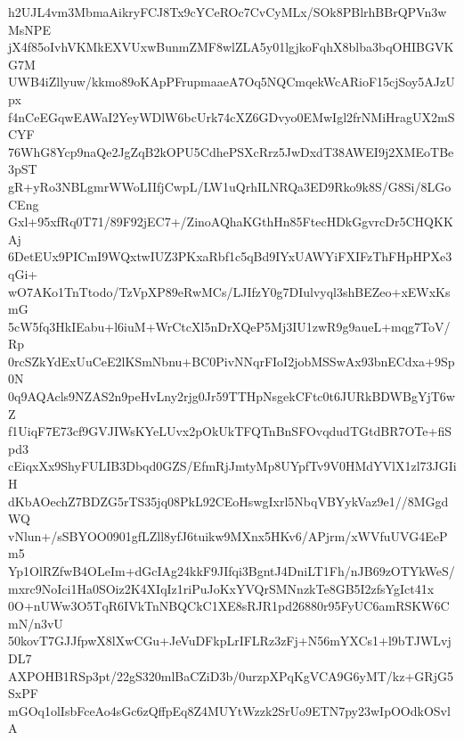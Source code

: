 h2UJL4vm3MbmaAikryFCJ8Tx9cYCeROc7CvCyMLx/SOk8PBlrhBBrQPVn3wMsNPE
jX4f85oIvhVKMkEXVUxwBunmZMF8wlZLA5y01lgjkoFqhX8blba3bqOHIBGVKG7M
UWB4iZllyuw/kkmo89oKApPFrupmaaeA7Oq5NQCmqekWcARioF15cjSoy5AJzUpx
f4nCeEGqwEAWaI2YeyWDlW6bcUrk74cXZ6GDvyo0EMwIgl2frNMiHragUX2mSCYF
76WhG8Ycp9naQe2JgZqB2kOPU5CdhePSXcRrz5JwDxdT38AWEI9j2XMEoTBe3pST
gR+yRo3NBLgmrWWoLIIfjCwpL/LW1uQrhILNRQa3ED9Rko9k8S/G8Si/8LGoCEng
Gxl+95xfRq0T71/89F92jEC7+/ZinoAQhaKGthHn85FtecHDkGgvrcDr5CHQKKAj
6DetEUx9PICmI9WQxtwIUZ3PKxaRbf1c5qBd9IYxUAWYiFXIFzThFHpHPXe3qGi+
wO7AKo1TnTtodo/TzVpXP89eRwMCs/LJIfzY0g7DIulvyql3shBEZeo+xEWxKsmG
5cW5fq3HkIEabu+l6iuM+WrCtcXl5nDrXQeP5Mj3IU1zwR9g9aueL+mqg7ToV/Rp
0rcSZkYdExUuCeE2lKSmNbnu+BC0PivNNqrFIoI2jobMSSwAx93bnECdxa+9Sp0N
0q9AQAcls9NZAS2n9peHvLny2rjg0Jr59TTHpNsgekCFtc0t6JURkBDWBgYjT6wZ
f1UiqF7E73cf9GVJIWsKYeLUvx2pOkUkTFQTnBnSFOvqdudTGtdBR7OTe+fiSpd3
cEiqxXx9ShyFULIB3Dbqd0GZS/EfmRjJmtyMp8UYpfTv9V0HMdYVlX1zl73JGIiH
dKbAOechZ7BDZG5rTS35jq08PkL92CEoHswgIxrl5NbqVBYykVaz9e1//8MGgdWQ
vNlun+/sSBYOO0901gfLZll8yfJ6tuikw9MXnx5HKv6/APjrm/xWVfuUVG4EePm5
Yp1OlRZfwB4OLeIm+dGcIAg24kkF9JIfqi3BgntJ4DniLT1Fh/nJB69zOTYkWeS/
mxrc9NoIci1Ha0SOiz2K4XIqIz1riPuJoKxYVQrSMNnzkTe8GB5I2zfsYgIct41x
0O+nUWw3O5TqR6IVkTnNBQCkC1XE8sRJR1pd26880r95FyUC6amRSKW6CmN/n3vU
50kovT7GJJfpwX8lXwCGu+JeVuDFkpLrIFLRz3zFj+N56mYXCs1+l9bTJWLvjDL7
AXPOHB1RSp3pt/22gS320mlBaCZiD3b/0urzpXPqKgVCA9G6yMT/kz+GRjG5SxPF
mGOq1olIsbFceAo4sGc6zQffpEq8Z4MUYtWzzk2SrUo9ETN7py23wIpOOdkOSvlA
